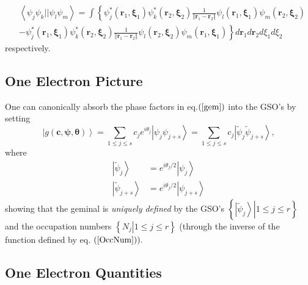 \documentclass[aps,preprint]{revtex4}%
\begin{document}
\begin{align}
&  \left\langle \psi_{j}\psi_{k}||\psi_{l}\psi_{m}\right\rangle =\int\left\{
\psi_{j}^{\ast}\left(  \boldsymbol{r}_{1}\boldsymbol{,\xi}_{1}\right)
\psi_{k}^{\ast}\left(  \boldsymbol{r}_{2}\boldsymbol{,\xi}_{2}\right)
\frac{1}{\left\Vert \boldsymbol{r}_{1}-\boldsymbol{r}_{2}\right\Vert }\psi
_{l}\left(  \boldsymbol{r}_{1}\boldsymbol{,\xi}_{1}\right)  \psi_{m}\left(
\boldsymbol{r}_{2}\boldsymbol{,\xi}_{2}\right)  \right.  \nonumber\\
&  -\left.  \psi_{j}^{\ast}\left(  \boldsymbol{r}_{1}\boldsymbol{,\xi}%
_{1}\right)  \psi_{k}^{\ast}\left(  \boldsymbol{r}_{2}\boldsymbol{,\xi}%
_{2}\right)  \frac{1}{\left\Vert \boldsymbol{r}_{1}-\boldsymbol{r}%
_{2}\right\Vert }\psi_{l}\left(  \boldsymbol{r}_{2}\boldsymbol{,\xi}%
_{2}\right)  \psi_{m}\left(  \boldsymbol{r}_{1}\boldsymbol{,\xi}_{1}\right)
\right\}  d\boldsymbol{r}_{1}d\boldsymbol{r}_{2}d\xi_{1}d\xi_{2}%
\end{align}
respectively.

\subsection{One Electron Picture\label{OneElecPic}}

One can canonically absorb the phase factors in eq.$\left(  \ref{gem}\right)
$ into the GSO's by setting
\begin{equation}
\left\vert g\left(  \boldsymbol{c},\boldsymbol{\psi,\theta}\right)
\right\rangle =\sum_{1\leq j\leq s}c_{j}e^{i\theta_{j}}\left\vert \psi_{j}%
\psi_{j+s}\right\rangle =\sum_{1\leq j\leq s}c_{j}\left\vert \tilde{\psi}%
_{j}\tilde{\psi}_{j+s}\right\rangle ,
\end{equation}
where
\begin{align}
\left\vert \tilde{\psi}_{j}\right\rangle  &  =e^{i\theta_{j}/2}\left\vert
\psi_{j}\right\rangle \nonumber\\
\left\vert \tilde{\psi}_{j+s}\right\rangle  &  =e^{i\theta_{j}/2}\left\vert
\psi_{j+s}\right\rangle
\end{align}
showing that the geminal is \emph{uniquely defined} by the GSO's $\left\{
\left.  \left\vert \tilde{\psi}_{j}\right\rangle \right\vert 1\leq j\leq
r\right\}  $ and the occupation numbers $\left\{  \left.  N_{j}\right\vert
1\leq j\leq r\right\}  $ (through the inverse of the function defined by eq.
$\left(  \ref{OccNum}\right)  ).$

\subsection{One Electron Quantities\label{OEP}}
\end{document}
